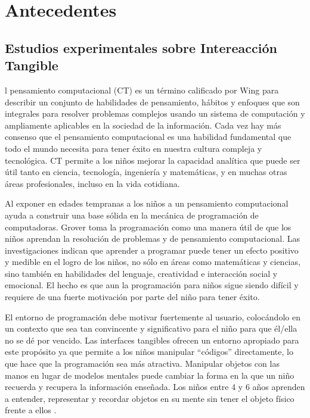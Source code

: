 \chapter{Antecedentes}
\label{chap:antecedentes}
\section{Estudios experimentales sobre Intereacción Tangible}


l pensamiento computacional (CT) es un término calificado por Wing \cite{Wing} para describir un conjunto de habilidades de pensamiento, hábitos y enfoques que son integrales para resolver problemas complejos usando un sistema de computación y ampliamente aplicables en la sociedad de la información. Cada vez hay más consenso que el pensamiento computacional es una habilidad fundamental que todo el mundo necesita para tener éxito en nuestra cultura compleja y tecnológica. CT permite a los niños mejorar la capacidad analítica que puede ser útil tanto en ciencia, tecnología, ingeniería y matemáticas, y en muchas otras áreas profesionales, incluso en la vida cotidiana. 

Al exponer en edades tempranas a los niños a un pensamiento computacional ayuda a construir una base sólida en la mecánica de programación de computadoras. Grover \cite{Grover} toma la programación como una manera útil de que los niños aprendan la resolución de problemas y de pensamiento computacional. Las investigaciones indican que aprender a programar puede tener un efecto positivo y medible en el logro de los niños, no sólo en áreas como matemáticas y ciencias, sino también en habilidades del lenguaje, creatividad e interacción social y emocional. El hecho es que aun la programación para niños sigue siendo difícil y requiere de una fuerte motivación por parte del niño para tener éxito.

El entorno de programación debe motivar fuertemente al usuario, colocándolo en un contexto que sea tan convincente y significativo para el niño para que él/ella no se dé por vencido. Las interfaces tangibles ofrecen un entorno apropiado para este propósito ya que permite a los niños manipular “códigos” directamente, lo que hace que la programación sea más atractiva. Manipular objetos con las manos en lugar de modelos mentales puede cambiar la forma en la que un niño recuerda y recupera la información enseñada. Los niños entre 4 y 6 años aprenden a entender, representar y recordar objetos en su mente sin tener el objeto físico frente a ellos \cite{Piaget}.

